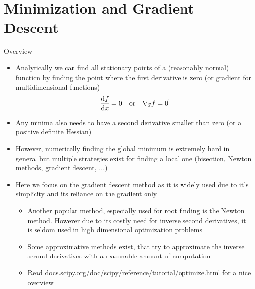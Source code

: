  \section{Minimization and Gradient Descent}
  \begin{frame}{Overview}
    \begin{itemize}
      \item Analytically we can find all stationary points of a (reasonably normal) function by finding the point where the first derivative is zero (or gradient for multidimensional functions)
      \begin{equation*}
        \frac{\mathrm{d}f}{\mathrm{d}x} = 0 \quad\text{or}\quad\nabla_{\vec{x}}f = \vec{0}
      \end{equation*}
      \item Any minima also needs to have a second derivative smaller than zero (or a positive definite Hessian)
      \item However, numerically finding the global minimum is extremely hard in general but multiple strategies exist for finding a local one (bisection, Newton methods, gradient descent, ...)
      \item Here we focus on the gradient descent method as it is widely used due to it's simplicity and its reliance on the gradient only
      \begin{itemize}
        \item Another popular method, especially used for root finding is the Newton method.
        However due to its costly need for inverse second derivatives, it is seldom used in high dimensional optimization problems
        \item Some approximative methods exist, that try to approximate the inverse second derivatives with a reasonable amount of computation
        \item Read \url{docs.scipy.org/doc/scipy/reference/tutorial/optimize.html} for a nice overview
      \end{itemize}
    \end{itemize}
  \end{frame}

